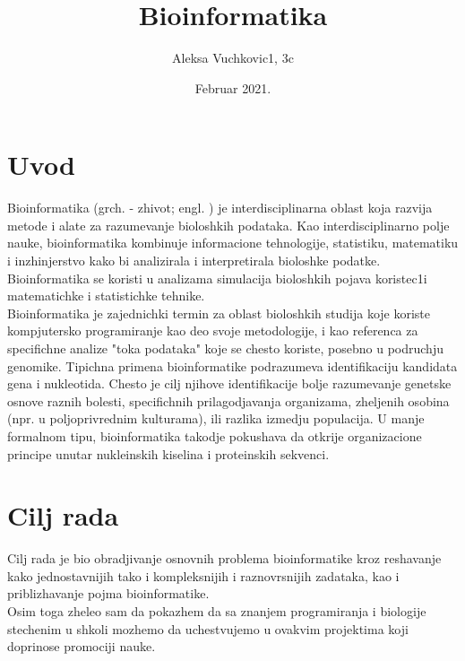 \documentclass[12pt]{article}
\title{\bf{Bioinformatika}}
\author{\large Aleksa Vuchkovic1, 3c}
\date{Februar 2021.}
\newcommand\eng{\fontencoding{OT1}\fontfamily{\rmdefault}\selectfont}
\newcommand\srb{\fontencoding{OT2}\fontfamily{\rmdefault}\selectfont}
\begin{document}
\maketitle
\tableofcontents
\vspace{3cm}
\section{Uvod} %

Bioinformatika (grch. \eng{bios}\srb{} - zhivot; engl. \eng{informatics}\srb{}) je interdisciplinarna oblast koja razvija metode i alate za razumevanje bioloshkih podataka. Kao interdisciplinarno polje nauke, bioinformatika kombinuje informacione tehnologije, statistiku, matematiku i inzhinjerstvo kako bi analizirala i interpretirala bioloshke podatke. Bioinformatika se koristi u analizama simulacija bioloshkih pojava koristec1i matematichke i statistichke tehnike.\\

Bioinformatika je zajednichki termin za oblast bioloshkih studija koje koriste kompjutersko programiranje kao deo svoje metodologije, i kao referenca za specifichne analize "toka podataka" koje se chesto koriste, posebno u podruchju genomike. Tipichna primena bioinformatike podrazumeva identifikaciju kandidata gena i nukleotida. Chesto je cilj njihove identifikacije bolje razumevanje genet\/ske osnove raznih bolesti, specifichnih prilagodjavanja organizama, zheljenih osobina (npr. u poljoprivrednim kulturama), ili razlika izmedju populacija. U manje formalnom tipu, bioinformatika takodje pokushava da otkrije organizacione principe unutar nukleinskih kiselina i proteinskih sekvenci.

\newpage
\section{Cilj rada} %

Cilj rada je bio obradjivanje osnovnih problema bioinformatike kroz reshavanje kako jednostavnijih tako i kompleksnijih i raznovrsnijih zadataka, kao i priblizhavanje pojma bioinformatike.\\

Osim toga zheleo sam da pokazhem da sa znanjem programiranja i biologije stechenim u shkoli mozhemo da uchestvujemo u ovakvim projektima koji doprinose promociji nauke.
\end{document}
